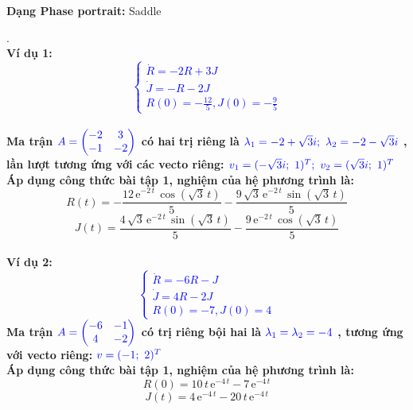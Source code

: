 \textbf{Dạng Phase portrait: } Saddle
\pagebreak
\begin{tcbdoublebox}[title={10. Cautious Lover and Hermit}]
\mdseries .\\
\bfseries Ví dụ 1: \\
\textcolor{blue}{$$\left\{\begin{matrix}
\dot{R} =  -2R +3J \\ 
\dot{J} =  -R-2J\\ 
R(0)= -\frac{12}{5}, J(0)=-\frac{9}{5}
\end{matrix}\right.$$}\\
\mdseries Ma trận $\color{blue}A=\begin{pmatrix}
-2 & 3\\ 
-1 & -2
\end{pmatrix}$ có hai trị riêng là 
$\color{blue}\lambda_{1}=-2+\sqrt{3}i;\ \lambda_{2}=-2-\sqrt{3}i$
, lần lượt tương ứng với các vecto riêng:
$\color{blue}v_{1} = (-\sqrt{3}i;\ 1)^{T};\ v_{2}=(\sqrt{3}i;\ 1)^{T}$\\Áp dụng công thức bài tập 1, nghiệm của hệ phương trình là:
$$R(t)=-\frac{12\,{\mathrm{e}}^{-2\,t}\,\cos\left(\sqrt{3}\,t\right)}{5}-\frac{9\,\sqrt{3}\,{\mathrm{e}}^{-2\,t}\,\sin\left(\sqrt{3}\,t\right)}{5}$$
$$J(t)=\frac{4\,\sqrt{3}\,{\mathrm{e}}^{-2\,t}\,\sin\left(\sqrt{3}\,t\right)}{5}-\frac{9\,{\mathrm{e}}^{-2\,t}\,\cos\left(\sqrt{3}\,t\right)}{5}$$
\\
\bfseries Ví dụ 2:\\
\textcolor{blue}{$$\left\{\begin{matrix}
\dot{R} = -6R -J \\ 
\dot{J} =  4R -2J\\ 
R(0)= -7, J(0)=4
\end{matrix}\right.$$}
\mdseries Ma trận $\color{blue}A=\begin{pmatrix}
-6 & -1\\ 
4 & -2
\end{pmatrix}$ có trị riêng bội hai là 
$\color{blue}\lambda_{1}=\lambda_{2}=-4$
, tương ứng với vecto riêng:
$\color{blue}v = (-1;\ 2)^{T}$\\Áp dụng công thức bài tập 1, nghiệm của hệ phương trình là:
$$R(0)=10\,t\,{\mathrm{e}}^{-4\,t}-7\,{\mathrm{e}}^{-4\,t}$$
$$J(t)=4\,{\mathrm{e}}^{-4\,t}-20\,t\,{\mathrm{e}}^{-4\,t}$$

\end{tcbdoublebox}
\pagebreak
